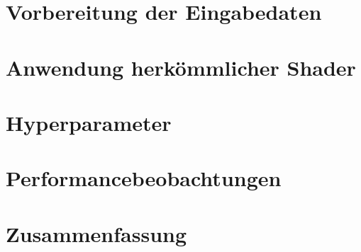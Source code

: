 \section{Vorbereitung der Eingabedaten}
\label{sec:preparation}

\section{Anwendung herkömmlicher Shader}
\label{sec:shader}

\section{Hyperparameter}
\label{sec:hyperparams}

\section{Performancebeobachtungen}
\label{sec:performance}

\section{Zusammenfassung}
\label{sec:conclusion}
